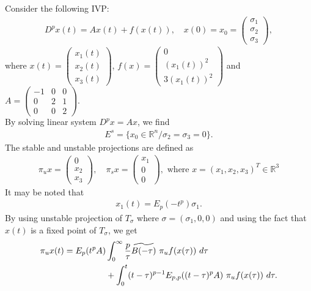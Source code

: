  \begin{exmp}
 Consider the following IVP:
 \begin{align}
 	D^p x(t) = A x(t) + f(x(t)),\quad  x(0) = x_0 = \begin{pmatrix}
 		\sigma_1 \\ \sigma_2 \\ \sigma_3
 	\end{pmatrix},
 \end{align}
 where $x(t) = \begin{pmatrix}
 x_1(t) \\ x_2(t) \\ x_3 (t) \end{pmatrix}$, $f(x) = \begin{pmatrix}
 0 \\ (x_1(t))^2 \\ 3 (x_1(t))^2
 \end{pmatrix}$ and $
 A = \begin{pmatrix}
 -1 & 0 & 0 \\ 
 0 & 2 & 1 \\ 
 0 & 0 & 2
 \end{pmatrix}.$\\ 
 By solving linear system $D^p x = A x$, we find
 \begin{align}
 	E^s = \{x_0 \in \mathbb{R}^n \slash \sigma_2 = \sigma_3 = 0 \}.
 \end{align} 
 The stable and unstable projections are defined as    
 \begin{align}
 	\pi_u x = \begin{pmatrix}
 		0 \\ x_2 \\ x_3
 	\end{pmatrix}, \quad \pi_s x = \begin{pmatrix}
 	x_1 \\ 0 \\0
 \end{pmatrix}, \text{ where  }x = (x_1,x_2,x_3)^T \in \mathbb{R}^3\end{align}
It may be noted that
 \begin{align} \label{ex2}
 	x_1(t) = E_p(-t^p) \sigma_1.
 \end{align}
 By using unstable projection of $T_{\sigma}$ where $\sigma = (\sigma_1,0,0)$ and using the fact that $x(t)$ is a fixed point of $T_{\sigma}$, we get
 \begin{align} \label{ex3}
 	\begin{split}
 		\pi_u x(t) = E_{p}(t^{p} A) &\int_{0}^{\infty} \frac{p}{\tau} \widetilde{B(-\tau)}~ \pi_u f(x(\tau))~ d\tau \\&+ \int_{0}^{t} (t-\tau)^{p-1} E_{p,p}((t-\tau)^p A)~ \pi_u f(x(\tau))~ d\tau.
 	\end{split}
 \end{align}
 

\end{exmp}

